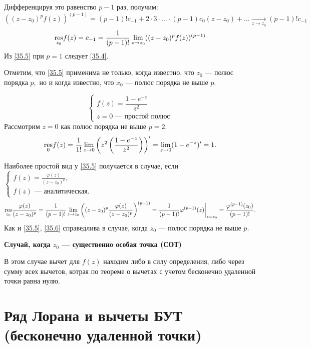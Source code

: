 \documentclass[../../main.tex]{subfiles}
\begin{document}
	Дифференцируя это равенство $p-1$ раз, получим:
	\[
		((z-z_0)^pf(z))^{(p-1)} = (p-1)!c_{-1} + 2 \cdot 3 \cdot \ldots \cdot 
		(p-1)c_0(z-z_0) + \ldots 
		\underset{z \to z_0}{\to} (p-1)!c_{-1}
	\]
	\begin{equation} \label{35.5}
		\underset{z_0}{\operatorname{res}} f(z) = c_{-1} = \frac{1}{(p-1)!}
		\lim\limits_{z\to z_0} ((z-z_0)^pf(z))^{(p-1)}
	\end{equation}
	Из \eqref{35.5} при $p=1$ следует \eqref{35.4}.
	
	Отметим, что \eqref{35.5} применима не только, когда известно, что $z_0$ --- 
	полюс порядка $p,$ но и когда известно, что $x_0$ --- полюс порядка не выше 
	$p.$
	
	\begin{example}
		\[
			\begin{cases}
				f(z) = \dfrac{1-e^{-z}}{z^2} \\
				z = 0 \text{ --- простой полюс}
			\end{cases}
		\]
		Рассмотрим $z = 0$ как полюс порядка не выше $p=2.$
		\[
			\underset{0}{\operatorname{res}}f(z) = \dfrac{1}{1!}\lim_{z\to 
			0}\left(z^2\left(\dfrac{1-e^{-z}}{z^2}\right)\right)' = 
			\lim_{z\to 0} (1 - e^{-z})' = 1.
		\]
	\end{example}
	
	Наиболее простой вид у \eqref{35.5} получается в случае, если $\begin{cases}
	f(z)  = \frac{\varphi(z)}{(z-z_0)^p}, \\
	f(z) \text{ --- аналитическая.}
	\end{cases}$
	\begin{equation} \label{35.6}
		\underset{z_0}{\operatorname{res}}  \frac{\varphi(z)}{(z-z_0)^p} = \frac{1}{(p-1)!}
		 \lim\limits_{z\to z_0} \left((z-z_0)^p 
		 \frac{\varphi(z)}{(z-z_0)^p}\right)^{(p-1)} = 
		 \frac{1}{(p-1)!} \varphi^{(p-1)}(z)\bigg|_{z = z_0} = 
		 \frac{\varphi^{(p-1)}(z_0)}{(p-1)!}.
	\end{equation}
	Как и \eqref{35.5}, \eqref{35.6} справедлива в случае, когда $z_0$ --- полюс 
	порядка не выше $p$.
	
	\textbf{Случай, когда $z_0$ --- существенно особая точка (СОТ)}
	
	В этом случае вычет для $f(z) $ находим либо в силу определения, либо через 
	сумму всех вычетов, котрая по теореме о вычетах с учетом бесконечно удаленной 
	точки равна нулю.
	
\section{Ряд Лорана и вычеты БУТ (бесконечно удаленной точки)}
\end{document}
